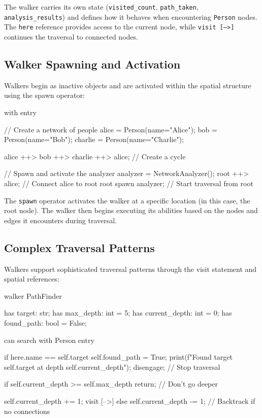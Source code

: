 The walker carries its own state (\texttt{visited\_count}, \texttt{path\_taken}, \texttt{analysis\_results}) and defines how it behaves when encountering \texttt{Person} nodes. The \texttt{here} reference provides access to the current node, while \texttt{visit [-->]} continues the traversal to connected nodes.

\subsection{Walker Spawning and Activation}

Walkers begin as inactive objects and are activated within the spatial structure using the spawn operator:

\begin{jacblock}
with entry {
    // Create a network of people
    alice = Person(name="Alice");
    bob = Person(name="Bob");
    charlie = Person(name="Charlie");

    alice ++> bob ++> charlie ++> alice;  // Create a cycle

    // Spawn and activate the analyzer
    analyzer = NetworkAnalyzer();
    root ++> alice;  // Connect alice to root
    root spawn analyzer;  // Start traversal from root
}
\end{jacblock}

The \texttt{spawn} operator activates the walker at a specific location (in this case, the root node). The walker then begins executing its abilities based on the nodes and edges it encounters during traversal.

\subsection{Complex Traversal Patterns}

Walkers support sophisticated traversal patterns through the visit statement and spatial references:

\begin{jacblock}
walker PathFinder {
    has target: str;
    has max_depth: int = 5;
    has current_depth: int = 0;
    has found_path: bool = False;

    can search with Person entry {
        if here.name == self.target {
            self.found_path = True;
            print(f"Found target {self.target} at depth {self.current_depth}");
            disengage;  // Stop traversal
        }

        if self.current_depth >= self.max_depth {
            return;  // Don't go deeper
        }

        self.current_depth += 1;
        visit [-->] else {
            self.current_depth -= 1;  // Backtrack if no connections
        }
    }
}
\end{jacblock}

